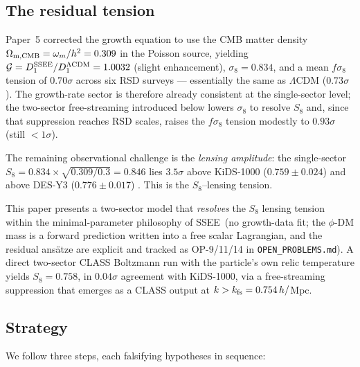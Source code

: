 \documentclass[12pt,a4paper]{article}
\newcommand{\SSEE}{\textsc{SSEE}}
\newcommand{\kfs}{k_{\rm fs}}
\begin{document}
\subsection{The residual tension}
\label{subsec:tension}

Paper~5 corrected the growth equation to use the CMB matter density
$\Omega_{\rm m,CMB} = \omega_m/h^2 = 0.309$ in the Poisson source,
yielding $\mathcal{G} = D_1^{\rm SSEE}/D_1^{\Lambda{\rm CDM}} = 1.0032$ (slight enhancement),
$\sigma_8 = 0.834$, and a mean $f\sigma_8$ tension of $0.70\sigma$ across six RSD surveys
\citep{Beutler2012,Howlett2015,Alam2017,Hou2021} --- essentially the same as
$\Lambda$CDM ($0.73\sigma$).  The growth-rate sector is therefore already
consistent at the single-sector level; the two-sector free-streaming introduced
below lowers $\sigma_8$ to resolve $S_8$ and, since that suppression reaches RSD
scales, raises the $f\sigma_8$ tension modestly to $0.93\sigma$ (still $<1\sigma$).

The remaining observational challenge is the \emph{lensing amplitude}: the
single-sector $S_8 = 0.834 \times \sqrt{0.309/0.3} = 0.846$ lies $3.5\sigma$ above
KiDS-1000 ($0.759 \pm 0.024$) \citep{KiDS2021} and above DES-Y3
($0.776 \pm 0.017$) \citep{DESY32022}.  This is the $S_8$--lensing tension.

This paper presents a two-sector model that \emph{resolves} the $S_8$ lensing
tension within the minimal-parameter philosophy of \SSEE\ (no growth-data fit; the
$\phi$-DM mass is a forward prediction written into a free scalar Lagrangian, and
the residual ans\"atze are explicit and tracked as OP-9/11/14 in
\texttt{OPEN\_PROBLEMS.md}).  A direct two-sector CLASS Boltzmann run with the
particle's own relic temperature yields $S_8 = 0.758$, in $0.04\sigma$ agreement
with KiDS-1000, via a free-streaming suppression that emerges as a CLASS output at
$k > \kfs = 0.754\,h/$Mpc.

\subsection{Strategy}
\label{subsec:strategy}

We follow three steps, each falsifying hypotheses in sequence:
\end{document}
